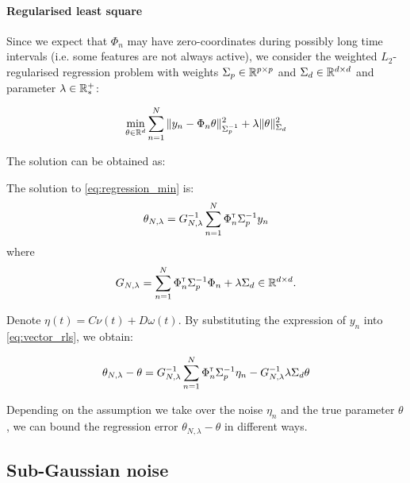 \documentclass{article}
\begin{document}
\paragraph{Regularised least square} Since we expect that $\Phi_n$ may have zero-coordinates during possibly long time intervals (i.e. some features are not always active), we consider the weighted $L_2$-regularised regression problem with weights  $\Sigma_p\in\mathbb{R}^{p\times p}$ and $\Sigma_d\in\mathbb{R}^{d\times d}$ and parameter $\lambda\in\mathbb{R}^+_*$:


\begin{equation}
    \label{eq:regression_min}
    \min_{\theta\in\mathbb{R}^d} \sum_{n=1}^N \|y_n -\Phi_n\theta\|_{\Sigma_p^{-1}}^2 + \lambda\|\theta\|_{\Sigma_d}^2
\end{equation}


The solution can be obtained as:

\begin{theorem}
\label{thm:regularized_solution}
The solution to \eqref{eq:regression_min} is:
\begin{equation}
    \label{eq:vector_rls}
    \theta_{N,\lambda} = G_{N, \lambda}^{-1} \sum_{n=1}^N \Phi_n^{\mathsf{\scriptscriptstyle T}} \Sigma_p^{-1} y_n
\end{equation}
where 
\begin{equation*}
    G_{N, \lambda} = \sum_{n=1}^N \Phi_{n}^{\mathsf{\scriptscriptstyle T}}\Sigma_p^{-1}\Phi_{n}  + \lambda \Sigma_d \in \mathbb{R}^{d\times d}.
\end{equation*}
\end{theorem}

Denote $\eta(t) = C\nu(t) + D\omega(t)$. By substituting the expression of $y_n$ into \eqref{eq:vector_rls}, we obtain:
\begin{lemma}
\label{lem:regression-error}
\begin{align*}
    \theta_{N,\lambda} - \theta = G_{N, \lambda}^{-1}\sum_{n=1}^N \Phi_n^{\mathsf{\scriptscriptstyle T}} \Sigma_p^{-1}\eta_n - G_{N, \lambda}^{-1}\lambda\Sigma_d\theta 
\end{align*}
\end{lemma}

Depending on the assumption we take over the noise $\eta_n$ and the true parameter $\theta$, we can bound the regression error $\theta_{N,\lambda} - \theta$ in different ways.

\subsection{Sub-Gaussian noise}
\end{document}
